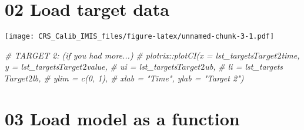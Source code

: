 \documentclass[
]{article}
\newenvironment{Shaded}{\begin{snugshade}}{\end{snugshade}}
\newcommand{\CommentTok}[1]{\textcolor[rgb]{0.56,0.35,0.01}{\textit{#1}}}
\newcommand{\DataTypeTok}[1]{\textcolor[rgb]{0.13,0.29,0.53}{#1}}
\newcommand{\DecValTok}[1]{\textcolor[rgb]{0.00,0.00,0.81}{#1}}
\newcommand{\KeywordTok}[1]{\textcolor[rgb]{0.13,0.29,0.53}{\textbf{#1}}}
\newcommand{\NormalTok}[1]{#1}
\newcommand{\OperatorTok}[1]{\textcolor[rgb]{0.81,0.36,0.00}{\textbf{#1}}}
\newcommand{\StringTok}[1]{\textcolor[rgb]{0.31,0.60,0.02}{#1}}
\begin{document}
\hypertarget{load-target-data}{%
\section{02 Load target data}\label{load-target-data}}

\begin{Shaded}
\end{Shaded}

\texttt{[image: CRS\_Calib\_IMIS\_files/figure-latex/unnamed-chunk-3-1.pdf]}

\begin{Shaded}
\begin{Highlighting}[]
\CommentTok{# TARGET 2: (if you had more...)}
\CommentTok{# plotrix::plotCI(x = lst_targets$Target2$time, y = lst_targets$Target2$value, }
\CommentTok{#                 ui = lst_targets$Target2$ub,}
\CommentTok{#                 li = lst_targets$Target2$lb,}
\CommentTok{#                 ylim = c(0, 1), }
\CommentTok{#                 xlab = "Time", ylab = "Target 2")}
\end{Highlighting}
\end{Shaded}

\hypertarget{load-model-as-a-function}{%
\section{03 Load model as a function}\label{load-model-as-a-function}}
\end{document}
